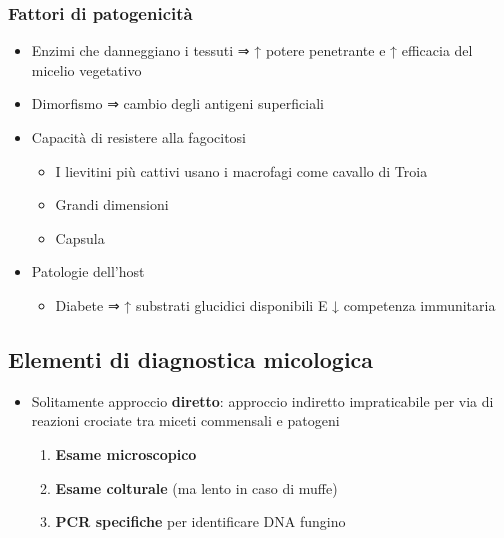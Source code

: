 \documentclass[italian,]{article}
\providecommand{\tightlist}{%
  \setlength{\itemsep}{0pt}\setlength{\parskip}{0pt}}
\begin{document}
\hypertarget{fattori-di-patogenicituxe0}{%
\subsubsection{Fattori di
patogenicità}\label{fattori-di-patogenicituxe0}}

\begin{itemize}
\tightlist
\item
  Enzimi che danneggiano i tessuti ⇒ ↑ potere penetrante e ↑ efficacia
  del micelio vegetativo
\item
  Dimorfismo ⇒ cambio degli antigeni superficiali
\item
  Capacità di resistere alla fagocitosi

  \begin{itemize}
  \tightlist
  \item
    I lievitini più cattivi usano i macrofagi come cavallo di Troia
  \item
    Grandi dimensioni
  \item
    Capsula
  \end{itemize}
\item
  Patologie dell'host

  \begin{itemize}
  \tightlist
  \item
    Diabete ⇒ ↑ substrati glucidici disponibili E ↓ competenza
    immunitaria
  \end{itemize}
\end{itemize}

\hypertarget{elementi-di-diagnostica-micologica}{%
\subsection{Elementi di diagnostica
micologica}\label{elementi-di-diagnostica-micologica}}

\begin{itemize}
\tightlist
\item
  Solitamente approccio \textbf{diretto}: approccio indiretto
  impraticabile per via di reazioni crociate tra miceti commensali e
  patogeni

  \begin{enumerate}
  \def\labelenumi{\arabic{enumi}.}
  \tightlist
  \item
    \textbf{Esame microscopico}
  \item
    \textbf{Esame colturale} (ma lento in caso di muffe)
  \item
    \textbf{PCR specifiche} per identificare DNA fungino
  \end{enumerate}
\end{itemize}
\end{document}
